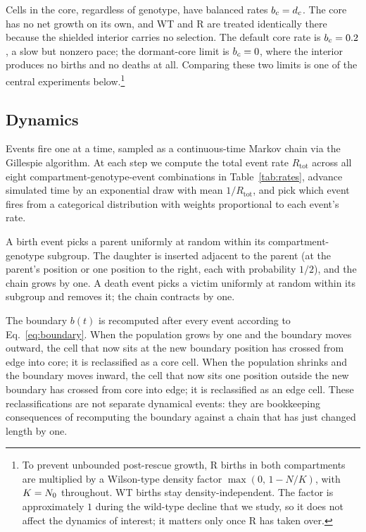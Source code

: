 Cells in the core, regardless of genotype, have balanced rates $b_c = d_c$. The core has no net growth on its own, and WT and R are treated identically there because the shielded interior carries no selection. The default core rate is $b_c = 0.2$, a slow but nonzero pace; the dormant-core limit is $b_c = 0$, where the interior produces no births and no deaths at all. Comparing these two limits is one of the central experiments below.\footnote{To prevent unbounded post-rescue growth, R births in both compartments are multiplied by a Wilson-type density factor $\max(0,\, 1 - N/K)$, with $K = N_0$ throughout. WT births stay density-independent. The factor is approximately $1$ during the wild-type decline that we study, so it does not affect the dynamics of interest; it matters only once R has taken over.}

\subsection{Dynamics}
\label{ssec:dynamics}

Events fire one at a time, sampled as a continuous-time Markov chain via the Gillespie algorithm. At each step we compute the total event rate $R_{\mathrm{tot}}$ across all eight compartment-genotype-event combinations in Table~\ref{tab:rates}, advance simulated time by an exponential draw with mean $1/R_{\mathrm{tot}}$, and pick which event fires from a categorical distribution with weights proportional to each event's rate.

A birth event picks a parent uniformly at random within its compartment-genotype subgroup. The daughter is inserted adjacent to the parent (at the parent's position or one position to the right, each with probability $1/2$), and the chain grows by one. A death event picks a victim uniformly at random within its subgroup and removes it; the chain contracts by one.

The boundary $b(t)$ is recomputed after every event according to Eq.~\eqref{eq:boundary}. When the population grows by one and the boundary moves outward, the cell that now sits at the new boundary position has crossed from edge into core; it is reclassified as a core cell. When the population shrinks and the boundary moves inward, the cell that now sits one position outside the new boundary has crossed from core into edge; it is reclassified as an edge cell. These reclassifications are not separate dynamical events: they are bookkeeping consequences of recomputing the boundary against a chain that has just changed length by one.

